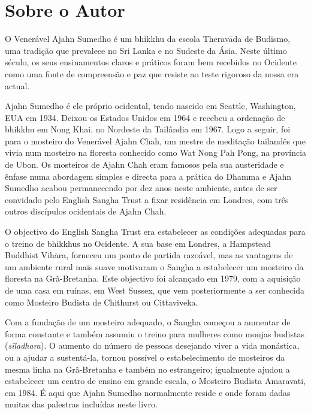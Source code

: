\chapter{Sobre o Autor}

O Venerável Ajahn Sumedho é um bhikkhu da escola Theravāda de Budismo, uma
tradição que prevalece no Sri Lanka e no Sudeste da Ásia. Neste último século,
os seus ensinamentos claros e práticos foram bem recebidos no Ocidente como uma
fonte de compreensão e paz que resiste ao teste rigoroso da nossa era actual.

Ajahn Sumedho é ele próprio ocidental, tendo nascido em Seattle, Washington, EUA
em 1934. Deixou os Estados Unidos em 1964 e recebeu a ordenação de bhikkhu em
Nong Khai, no Nordeste da Tailândia em 1967. Logo a seguir, foi para o mosteiro
do Venerável Ajahn Chah, um mestre de meditação tailandês que vivia num mosteiro
na floresta conhecido como Wat Nong Pah Pong, na província de Ubon. Os mosteiros
de Ajahn Chah eram famosos pela sua austeridade e ênfase numa abordagem simples
e directa para a prática do Dhamma e Ajahn Sumedho acabou permanecendo por dez
anos neste ambiente, antes de ser convidado pelo English Sangha Trust a fixar
residência em Londres, com três outros discípulos ocidentais de Ajahn Chah.

O objectivo do English Sangha Trust era estabelecer as condições adequadas para
o treino de bhikkhus no Ocidente. A sua base em Londres, a Hampstead Buddhist
Vihāra, forneceu um ponto de partida razoável, mas as vantagens de um ambiente
rural mais suave motivaram o Sangha a estabelecer um mosteiro da floresta na
Grã-Bretanha. Este objectivo foi alcançado em 1979, com a aquisição de uma casa
em ruínas, em West Sussex, que vem posteriormente a ser conhecida como Mosteiro
Budista de Chithurst ou Cittaviveka.

Com a fundação de um mosteiro adequado, o Sangha começou a aumentar de forma
constante e também assumiu o treino para mulheres como monjas budistas
(\emph{sīladhara}). O aumento do número de pessoas desejando viver a vida
monástica, ou a ajudar a sustentá-la, tornou possível o estabelecimento de
mosteiros da mesma linha na Grã-Bretanha e também no estrangeiro; igualmente
ajudou a estabelecer um centro de ensino em grande escala, o Mosteiro Budista
Amaravati, em 1984. É aqui que Ajahn Sumedho normalmente reside e onde foram
dadas muitas das palestras incluídas neste livro.

